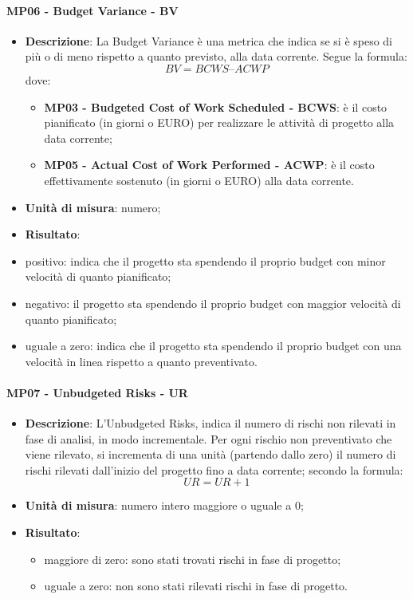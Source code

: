  		\paragraph{MP06 - Budget Variance - BV}
 		\begin{itemize}
 			\item \textbf{Descrizione}:
 			La Budget Variance è una metrica che indica se si è speso di più o di meno rispetto a quanto previsto, alla data corrente. Segue la formula:
 			\begin{displaymath}
 				BV = {BCWS – ACWP}
 			\end{displaymath}
 			dove:
 			\begin{itemize}
 				\item {\bfseries MP03 - Budgeted Cost of Work Scheduled - BCWS}: è il costo pianificato (in giorni o EURO) per realizzare le attività di progetto alla data corrente;
 				\item {\bfseries MP05 - Actual Cost of Work Performed - ACWP}: è il costo effettivamente sostenuto (in giorni o EURO) alla data corrente.
 			\end{itemize}
 			\item \textbf{Unità di misura}: numero;
 			\item \textbf{Risultato}:
 			\item positivo: indica che il progetto sta spendendo il proprio budget con minor velocità di quanto pianificato;
 			\item negativo: il progetto sta spendendo il proprio budget con maggior velocità di quanto pianificato;
 			\item uguale a zero: indica che il progetto sta spendendo il proprio budget con una velocità in linea rispetto a quanto preventivato. \\
 		\end{itemize}
 		
 		\paragraph{MP07 - Unbudgeted Risks - UR}
 		\begin{itemize}
 			\item \textbf{Descrizione}:
 			L'Unbudgeted Risks, indica il numero di rischi non rilevati in fase di analisi, in modo incrementale. Per ogni rischio non preventivato che viene rilevato, si incrementa di una unità (partendo dallo zero) il numero di rischi rilevati dall'inizio del progetto fino a data corrente; secondo la formula:
 			\begin{displaymath}
 				UR = UR + 1
 			\end{displaymath}
 			\item \textbf{Unità di misura}: numero intero maggiore o uguale a 0;
 			\item \textbf{Risultato}:
 			\begin{itemize}
 				\item maggiore di zero: sono stati trovati rischi in fase di progetto;
 				\item uguale a zero: non sono stati rilevati rischi in fase di progetto. \\
 			\end{itemize}
 		\end{itemize}
 		
